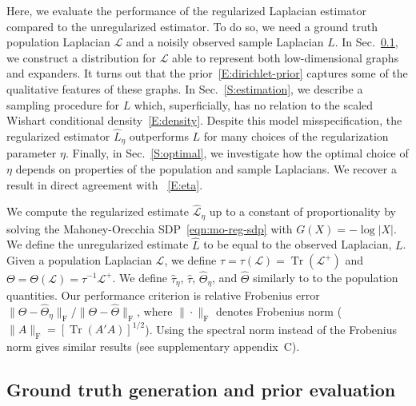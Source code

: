 \documentclass[12pt]{article}
\DeclareMathOperator*{\Tr}{Tr}
\theoremstyle{plain}
\begin{document}
Here, we evaluate the performance of the regularized Laplacian
estimator compared to the unregularized estimator.  To do so, we need
a ground truth population Laplacian $\mathcal{L}$ and a noisily
observed sample Laplacian $L$. In Sec.~\ref{S:prior-evaluation}, we
construct a distribution for $\mathcal{L}$ able to represent both
low-dimensional graphs and expanders.  It turns out that the
prior~\eqref{E:dirichlet-prior} captures some of the qualitative
features of these graphs.  In Sec.~\ref{S:estimation}, we describe a
sampling procedure for $L$ which, superficially, has no relation to
the scaled Wishart conditional density~\eqref{E:density}.  Despite
this model misspecification, the regularized estimator $\hat L_{\eta}$
outperforms $L$ for many choices of the regularization parameter
$\eta$.  Finally, in Sec.~\ref{S:optimal}, we investigate how the
optimal choice of $\eta$ depends on properties of the population and
sample Laplacians.  We recover a result in direct agreement with
~\eqref{E:eta}.

We compute the regularized estimate $\mathcal{\hat L}_\eta$ up to a
constant of proportionality by solving the Mahoney-Orecchia
SDP~\eqref{eqn:mo-reg-sdp} with $G(X) = -\log|X|$.  We define the
unregularized estimate $\hat L$ to be equal to the observed Laplacian,
$L$.  Given a population Laplacian $\mathcal{L}$, we define
$\tau = \tau(\mathcal{L}) = \Tr(\mathcal{L}^+)$ and
$\Theta = \Theta(\mathcal{L}) = \tau^{-1} \mathcal{L}^+$. We define
$\hat \tau_\eta$, $\hat \tau$, $\hat \Theta_\eta$, and $\hat \Theta$
similarly to to the population quantities.  Our performance
criterion is relative Frobenius error
$\|\Theta - \hat \Theta_\eta\|_\mathrm{F} / \|\Theta - \hat \Theta
\|_\mathrm{F}$, where $\|\cdot\|_\mathrm{F}$ denotes Frobenius norm
($\|A\|_\mathrm{F} = [\Tr(A' A)]^{1/2}$).  Using the spectral norm
instead of the Frobenius norm gives similar results (see
supplementary appendix~C).


\subsection{Ground truth generation and prior evaluation}\label{S:prior-evaluation}
\end{document}
